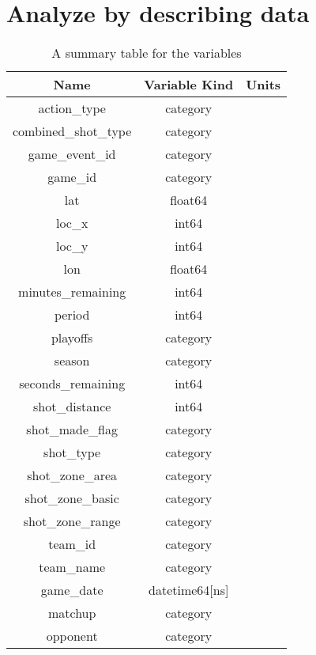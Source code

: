 \documentclass[a4paper,11pt,onecolumn,twoside]{article}
\begin{document}
\section{Analyze by describing data}
\begin{table}[htbp]
	\centering
	\begin{tabular}{ccc}
		\midrule[1.5pt]
		Name &Variable Kind  & Units\\
		\hline
		action\_type                 &category	&	\\
		combined\_shot\_type          &category	&	\\
		game\_event\_id               &category	&	\\
		game\_id                     &category	&	\\
		lat                         & float64	&	\\
		loc\_x                       &   int64	&	\\
		loc\_y                       &   int64	&	\\
		lon                         & float64	&	\\
		minutes\_remaining           &   int64	&	\\
		period                      &   int64	&	\\
		playoffs                    &category	&	\\
		season                      &category	&	\\
		seconds\_remaining           &   int64	&	\\
		shot\_distance               &   int64	&	\\
		shot\_made\_flag      			&category	&	\\
		shot\_type                   &category	&	\\
		shot\_zone\_area              &category	&	\\
		shot\_zone\_basic             &category	&	\\
		shot\_zone\_range             &category	&	\\
		team\_id                     &category	&	\\
		team\_name                   &category	&	\\
		game\_date             		&datetime64[ns]&	\\
		matchup                     &category	&	\\
		opponent                    &category	&	\\
		\midrule[1.5pt]
	\end{tabular}
	\caption{A summary table for the variables }
\end{table}
\end{document}
